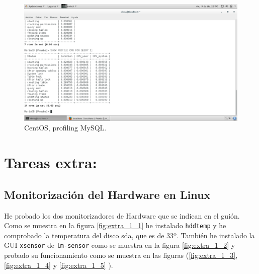 \begin{figure}[H] 
	\centering
	\includegraphics[width=14.7cm]{./img/ejercicio9_4.png} 	
	\caption{CentOS, profiling MySQL.} \label{fig:ejercicio9_4}
\end{figure}







\section{Tareas extra:}

\subsection{Monitorización del Hardware en Linux}

He probado los dos monitorizadores de Hardware que se indican en el guión. Como se muestra en la figura \ref{fig:extra_1_1} he instalado \texttt{hddtemp} y he comprobado la temperatura del disco sda, que es de 33º. También he instalado la GUI \texttt{xsensor} de \texttt{lm-sensor} como se muestra en la figura \ref{fig:extra_1_2} y probado su funcionamiento como se muestra en las figuras (\ref{fig:extra_1_3}, \ref{fig:extra_1_4} y \ref{fig:extra_1_5} ).

